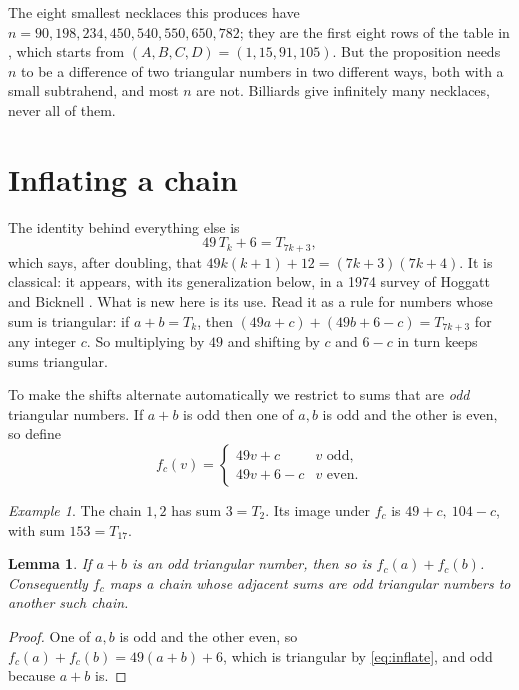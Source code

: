\documentclass[11pt]{article}
\newtheorem{lemma}[theorem]{Lemma}
\theoremstyle{definition}
\theoremstyle{remark}
\newtheorem*{example}{Example}
\begin{document}
The eight smallest necklaces this produces have $n=90,198,234,450,540,550,650,782$; they are the
first eight rows of the table in \cite{BG}, which starts from $(A,B,C,D)=(1,15,91,105)$. But the
proposition needs $n$ to be a difference of two triangular numbers in two different ways, both
with a small subtrahend, and most $n$ are not. Billiards give infinitely many necklaces, never all
of them.

\section{Inflating a chain}

The identity behind everything else is
\begin{equation}\label{eq:inflate}
  49\,T_k+6=T_{7k+3},
\end{equation}
which says, after doubling, that $49k(k+1)+12=(7k+3)(7k+4)$. It is classical: it appears, with its
generalization below, in a 1974 survey of Hoggatt and Bicknell \cite[(4.3), (4.5)]{HB}. What is new
here is its use. Read it as a rule for numbers whose
sum is triangular: if $a+b=T_k$, then $(49a+c)+(49b+6-c)=T_{7k+3}$ for any integer $c$. So
multiplying by $49$ and shifting by $c$ and $6-c$ in turn keeps sums triangular.

To make the shifts alternate automatically we restrict to sums that are \emph{odd} triangular
numbers. If $a+b$ is odd then one of $a,b$ is odd and the other is even, so define
\[
  f_c(v)=\begin{cases} 49v+c & v \text{ odd},\\ 49v+6-c & v\text{ even}.\end{cases}
\]

\begin{example}
The chain $1,2$ has sum $3=T_2$. Its image under $f_c$ is $49+c,\ 104-c$, with sum $153=T_{17}$.
\end{example}

\begin{lemma}\label{lem:block}
If $a+b$ is an odd triangular number, then so is $f_c(a)+f_c(b)$. Consequently $f_c$ maps a chain
whose adjacent sums are odd triangular numbers to another such chain.
\end{lemma}

\begin{proof}
One of $a,b$ is odd and the other even, so $f_c(a)+f_c(b)=49(a+b)+6$, which is triangular by
\eqref{eq:inflate}, and odd because $a+b$ is.
\end{proof}
\end{document}

